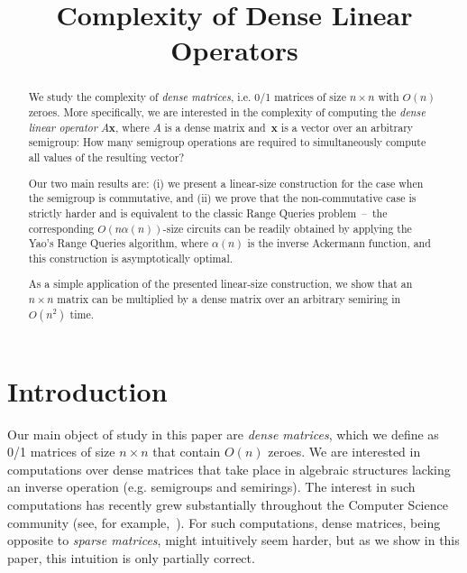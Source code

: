 \documentclass[11pt,letterpaper]{article}
\begin{document}

\sloppy
\author{}
\date{}
\title{Complexity of Dense Linear Operators}
\maketitle

\begin{abstract}
We study the complexity of \emph{dense matrices}, i.e. 0/1 matrices of size
$n \times n$ with $O(n)$ zeroes. More specifically, we are interested in
the complexity of computing the \emph{dense linear operator} $A\mathbf{x}$,
where $A$ is a dense matrix and~$\mathbf{x}$ is a vector over an arbitrary
semigroup: How many semigroup operations are required to simultaneously compute
all values of the resulting vector?

Our two main results are: (i) we present a linear-size construction for the case
when the semigroup is commutative, and (ii) we prove that the non-commutative
case is strictly harder and is equivalent to the classic Range Queries
problem~--~the corresponding $O(n\alpha(n))$-size circuits can be readily
obtained by applying the Yao's Range Queries algorithm, where $\alpha(n)$ is the
inverse Ackermann function, and this construction is asymptotically
optimal.

As a simple application of the presented linear-size construction, we show that
an $n\times n$ matrix can be multiplied by a dense matrix over an arbitrary
semiring in $O(n^2)$ time.

\end{abstract}


\section{Introduction}

Our main object of study in this paper are \emph{dense matrices}, which we
define as 0/1 matrices of size $n \times n$ that contain $O(n)$ zeroes. We are
interested in computations over dense matrices that take place in algebraic
structures lacking an inverse operation (e.g. semigroups and semirings).
The interest in such computations has recently grew substantially throughout the
Computer Science community (see, for
example,~\cite{Jukna16,Williams14,butkovic10systems}).
For such computations, dense matrices, being opposite to \emph{sparse matrices},
might intuitively seem harder, but as we show in this paper, this intuition is
only partially correct.
\end{document}
